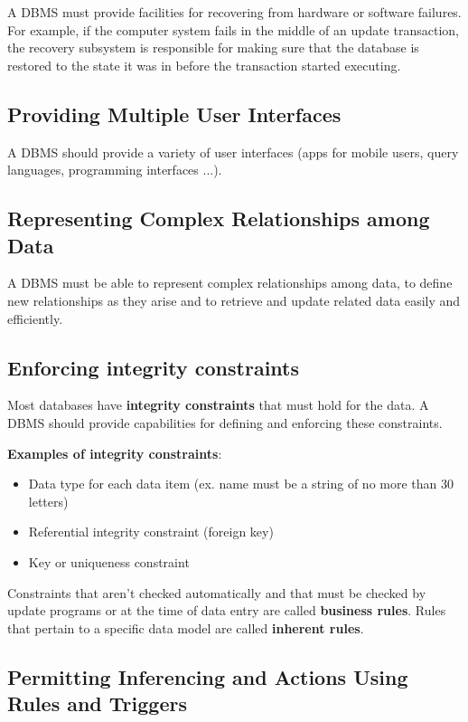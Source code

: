 A DBMS must provide facilities for recovering from hardware or software failures. For example, if the computer system fails in the middle of an update transaction, the recovery subsystem is responsible for making sure that the database is restored to the state it was in before the transaction started executing.

\subsection{Providing Multiple User Interfaces}

A DBMS should provide a variety of user interfaces (apps for mobile users, query languages, programming interfaces ...).

\subsection{Representing Complex Relationships among Data}

A DBMS must be able to represent complex relationships among data, to define new relationships as they arise and to retrieve and update related data easily and efficiently. 

\subsection{Enforcing integrity constraints}

Most databases have \textbf{integrity constraints} that must hold for the data. A DBMS should provide capabilities for defining and enforcing these constraints. 

\textbf{Examples of integrity constraints}:

\begin{itemize}
    \item Data type for each data item (ex. name must be a string of no more than 30 letters)
    \item Referential integrity constraint (foreign key)
    \item Key or uniqueness constraint
\end{itemize}

Constraints that aren't checked automatically and that must be checked by update programs or at the time of data entry are called \textbf{business rules}. Rules that pertain to a specific data model are called \textbf{inherent rules}.

\subsection{Permitting Inferencing and Actions Using Rules and Triggers}

